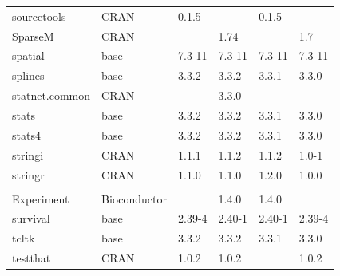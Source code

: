 \begin{longtable}{llllll}
sourcetools                   & \acrshort{CRAN}                      & 0.1.5       &             & 0.1.5          &                   \\
\rowcolor{black!5}
SparseM                       & \acrshort{CRAN}                      &             & 1.74        &                & 1.7                \\
\rowcolor{black!10}
spatial                       & base                      & 7.3-11      & 7.3-11      & 7.3-11         & 7.3-11            \\
\rowcolor{black!5}
splines                       & base                      & 3.3.2       & 3.3.2       & 3.3.1          & 3.3.0              \\
\rowcolor{black!10}
statnet.common                & \acrshort{CRAN}                      &             & 3.3.0       &                &                   \\
\rowcolor{black!5}
stats                         & base                      & 3.3.2       & 3.3.2       & 3.3.1          & 3.3.0              \\
\rowcolor{black!10}
stats4                        & base                      & 3.3.2       & 3.3.2       & 3.3.1          & 3.3.0             \\
\rowcolor{black!5}
stringi                       & \acrshort{CRAN}                      & 1.1.1       & 1.1.2       & 1.1.2          & 1.0-1              \\
\rowcolor{black!10}
stringr                       & \acrshort{CRAN}                      & 1.1.0       & 1.1.0       & 1.2.0          & 1.0.0             \\
\rowcolor{black!5}
\begin{tabular}[c]{@{}l@{}}Summarized\\Experiment \end{tabular}          & Bioconductor              &             & 1.4.0       & 1.4.0          &                    \\
\rowcolor{black!10}
survival                      & base                      & 2.39-4      & 2.40-1      & 2.40-1         & 2.39-4            \\
\rowcolor{black!5}
tcltk                         & base                      & 3.3.2       & 3.3.2       & 3.3.1          & 3.3.0              \\
\rowcolor{black!10}
testthat                      & \acrshort{CRAN}                      & 1.0.2       & 1.0.2       &                & 1.0.2             \\

\end{longtable}
